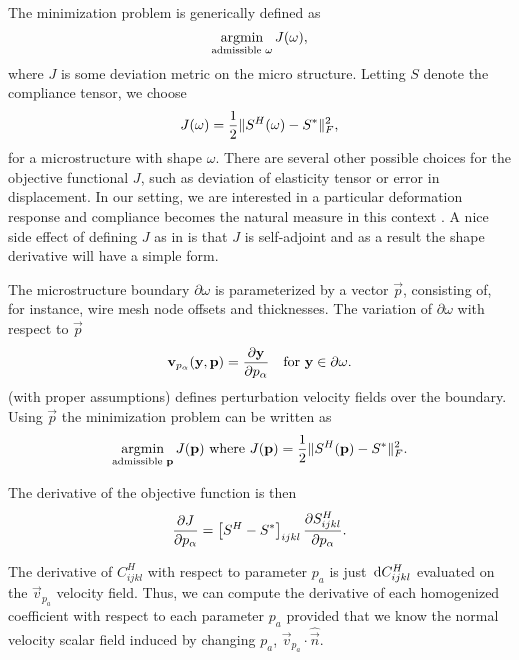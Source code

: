 \documentclass[twocolumn,10pt]{article}
\begin{document}
The minimization problem is generically defined as 
\begin{equation}
  \label{eqn:min}
  \operatorname*{argmin}_\text{admissible $\omega$} J(\omega),
\end{equation}
where $J$ is some deviation metric on the micro structure. Letting $S$
denote the compliance tensor, we choose
\begin{equation}
  \label{eqn:compObjective}
  J(\omega) = \frac{1}{2}\lVert S^H(\omega) - S^*\rVert^2_F,
\end{equation}
for a microstructure with shape $\omega$. There are several other
possible choices for the objective functional $J$, such as deviation
of elasticity tensor or error in displacement. In our setting, we are
interested in a particular deformation response and compliance becomes
the natural measure in this context . A nice side effect of defining $J$ as in
 is that $J$ is self-adjoint and as a result the
shape derivative will have a simple form.

The microstructure boundary $\partial \omega$ is parameterized by a
vector $\vec{p}$, consisting of, for instance, wire mesh node offsets
and thicknesses. The variation of $\partial \omega$ with respect to
$\vec{p}$
\begin{equation}
  \mathbf v_{p_\alpha}(\mathbf y,\mathbf p) = \frac{\partial \mathbf y}{\partial p_\alpha}\quad\text{for } \mathbf y\in \partial\omega.
\end{equation}
(with proper assumptions) defines perturbation velocity fields over
the boundary. Using $\vec{p}$ the minimization problem can be written
as
\begin{equation}
  \label{eqn:minParam}
  \operatorname*{argmin}_\text{admissible $\mathbf p$} J(\mathbf p)\text{ where }
  J(\mathbf p) = \frac{1}{2}\lVert S^H(\mathbf p) - S^*\rVert^2_F.
\end{equation}

The derivative of the objective function is then
\begin{equation}
  \frac{\partial J}{\partial p_\alpha} = \left[S^H - S^*\right]_{ijkl} \frac{\partial S^H_{ijkl}}{\partial p_\alpha}.
\end{equation}

The derivative of $C^H_{ijkl}$ with respect to parameter $p_a$ is just
$\, \mathrm{d} C^H_{ijkl}$ evaluated on the $\vec{v}_{p_a}$ velocity field. Thus,
we can compute the derivative of each homogenized coefficient with
respect to each parameter $p_a$ provided that we know the normal
velocity scalar field induced by changing $p_a$, $\vec{v}_{p_a} \cdot
\hat{\vec{n}}$.
\end{document}
